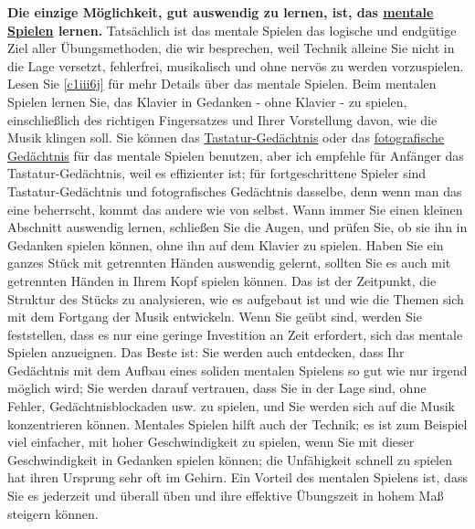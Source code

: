 \textbf{Die einzige Möglichkeit, gut auswendig zu lernen, ist, das \hyperref[c1iii6tastatur]{mentale Spielen} lernen.}
Tatsächlich ist das mentale Spielen das logische und endgütige Ziel aller Übungsmethoden, die wir besprechen, weil Technik alleine Sie nicht in die Lage versetzt, fehlerfrei, musikalisch und ohne nervös zu werden vorzuspielen.
Lesen Sie \hyperref[c1iii6j]{\autoref{c1iii6j}} für mehr Details über das mentale Spielen.
Beim mentalen Spielen lernen Sie, das Klavier in Gedanken - ohne Klavier - zu spielen, einschließlich des richtigen Fingersatzes und Ihrer Vorstellung davon, wie die Musik klingen soll.
Sie können das \hyperref[c1iii6tastatur]{Tastatur-Gedächtnis} oder das \hyperref[c1iii6foto]{fotografische Gedächtnis} für das mentale Spielen benutzen, aber ich empfehle für Anfänger das Tastatur-Gedächtnis, weil es effizienter ist;
für fortgeschrittene Spieler sind Tastatur-Gedächtnis und  fotografisches Gedächtnis dasselbe, denn wenn man das eine beherrscht, kommt das andere wie von selbst.
Wann immer Sie einen kleinen Abschnitt auswendig lernen, schließen Sie die Augen, und prüfen Sie, ob sie ihn in Gedanken spielen können, ohne ihn auf dem Klavier zu spielen.
Haben Sie ein ganzes Stück mit getrennten Händen auswendig gelernt, sollten Sie es auch mit getrennten Händen in Ihrem Kopf spielen können.
Das ist der Zeitpunkt, die Struktur des Stücks zu analysieren, wie es aufgebaut ist und wie die Themen sich mit dem Fortgang der Musik entwickeln.
Wenn Sie geübt sind, werden Sie feststellen, dass es nur eine geringe Investition an Zeit erfordert, sich das mentale Spielen anzueignen.
Das Beste ist: Sie werden auch entdecken, dass Ihr Gedächtnis mit dem Aufbau eines soliden mentalen Spielens so gut wie nur irgend möglich wird; Sie werden darauf vertrauen, dass Sie in der Lage sind, ohne Fehler, Gedächtnisblockaden usw. zu spielen, und Sie werden sich auf die Musik konzentrieren können.
Mentales Spielen hilft auch der Technik; es ist zum Beispiel viel einfacher, mit hoher Geschwindigkeit zu spielen, wenn Sie mit dieser Geschwindigkeit in Gedanken spielen können; die Unfähigkeit schnell zu spielen hat ihren Ursprung sehr oft im Gehirn.
Ein Vorteil des mentalen Spielens ist, dass Sie es jederzeit und überall üben und ihre effektive Übungszeit in hohem Maß steigern können.

